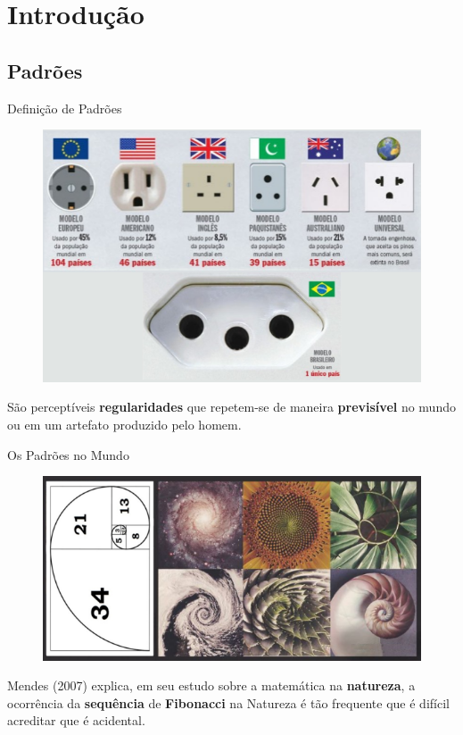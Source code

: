 \section{Introdução}

\subsection{Padrões}
    \begin{frame}[fragile]{Definição de Padrões}
        \begin{figure}[H]
        \begin{center}
            \includegraphics[scale=0.50]{images/padroes.png}
        \end{center}
        \end{figure}

        São perceptíveis \textbf{regularidades} que repetem-se de maneira
        \textbf{previsível} no  mundo ou em um artefato produzido pelo homem.
    \end{frame}

    \begin{frame}[fragile]{Os Padrões no Mundo}
        \begin{figure}[H]
        \begin{center}
            \includegraphics[scale=0.60]{images/padroes_mundo.png}
        \end{center}
        \end{figure}

        Mendes (2007) explica, em seu estudo sobre a matemática na
        \textbf{natureza}, a ocorrência da \textbf{sequência} de
        \textbf{Fibonacci} na Natureza é tão frequente que é difícil acreditar
        que é acidental.
    \end{frame}

